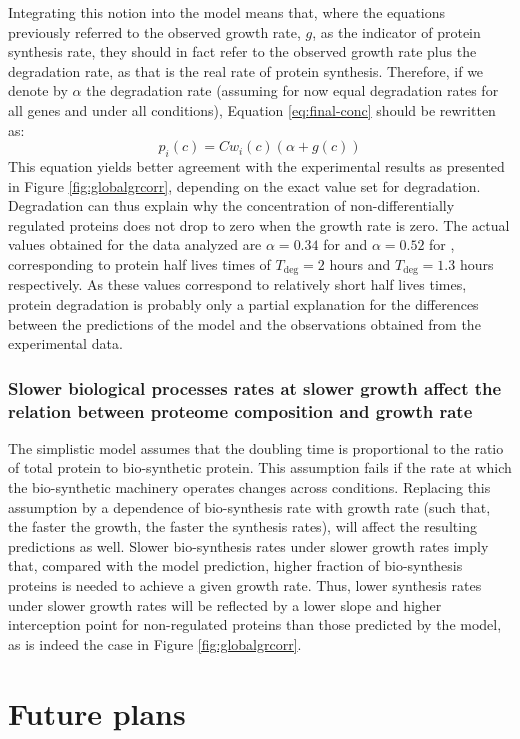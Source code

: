\documentclass[notitlepage]{article}
\begin{document}
Integrating this notion into the model means that, where the equations previously referred to the observed growth rate, $g$, as the indicator of protein synthesis rate, they should in fact refer to the observed growth rate plus the degradation rate, as that is the real rate of protein synthesis.
Therefore, if we denote by $\alpha$ the degradation rate (assuming for now equal degradation rates for all genes and under all conditions), Equation \ref{eq:final-conc} should be rewritten as:
\begin{equation}
  \label{eq:final-conc-deg}
  p_i(c)=Cw_i(c)(\alpha+g(c))
\end{equation}
This equation yields better agreement with the experimental results as presented in Figure \ref{fig:globalgrcorr}, depending on the exact value set for degradation.
Degradation can thus explain why the concentration of non-differentially regulated proteins does not drop to zero when the growth rate is zero.
The actual values obtained for the data analyzed are $\alpha=0.34$ for \cite{Valgepea2013} and $\alpha=0.52$ for \cite{Heinemann2014}, corresponding to protein half lives times of $T_{\text{deg}}=2$ hours and $T_{\text{deg}}=1.3$ hours respectively.
As these values correspond to relatively short half lives times, protein degradation is probably only a partial explanation for the differences between the predictions of the model and the observations obtained from the experimental data.

\subsubsection{Slower biological processes rates at slower growth affect the relation between proteome composition and growth rate}
The simplistic model assumes that the doubling time is proportional to the ratio of total protein to bio-synthetic protein.
This assumption fails if the rate at which the bio-synthetic machinery operates changes across conditions.
Replacing this assumption by a dependence of bio-synthesis rate with growth rate (such that, the faster the growth, the faster the synthesis rates), will affect the resulting predictions as well.
Slower bio-synthesis rates under slower growth rates imply that, compared with the model prediction, higher fraction of bio-synthesis proteins is needed to achieve a given growth rate.
Thus, lower synthesis rates under slower growth rates will be reflected by a lower slope and higher interception point for non-regulated proteins than those predicted by the model, as is indeed the case in Figure \ref{fig:globalgrcorr}.
\section{Future plans}
\end{document}
